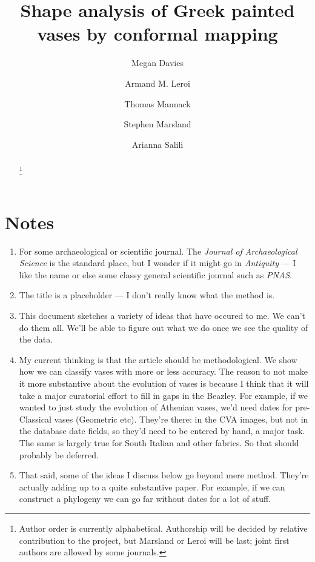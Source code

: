 \documentclass[onecolumn,10pt]{article}
\author[1]{Megan Davies}
\author[2]{Armand M. Leroi}
\author[3]{Thomas Mannack}
\author[2]{Stephen Marsland}
\author[4]{Arianna Salili}
\affil[1]{Department of Mathematics, Victoria University, Wellington, New Zealand}
\affil[2]{Department of Life Sciences, Imperial College London, London SW7 2AZ, UK}
\affil[3]{Department of Classics, University of Oxford}
\affil[4]{Department of Mathematics, Brunel University}
\title{Shape analysis of Greek painted vases by conformal mapping}
\begin{document}
\maketitle

\begin{abstract}
\footnote{Author order is currently alphabetical. Authorship will be decided by relative contribution to the project, but Marsland or Leroi will be last; joint first authors are allowed by some journals.}
\end{abstract}

\clearpage
\section*{Notes}

\begin{enumerate}
\item For some archaeological or scientific journal. The \emph{Journal of Archaeological Science} is the standard place, but I wonder if it might go in \emph{Antiquity} --- I like the name or else some classy general scientific journal such as \emph{PNAS}. 
\item The title is a placeholder --- I don't really know what the method is.
\item This document sketches a variety of ideas that have occured to me. We can't do them all.  We'll be able to figure out what we do once we see the quality of the data.
\item My current thinking is that the article should be methodological. We show how we can classify vases with more or less accuracy. The reason to not make it more substantive about the evolution of vases is because I think that it will take a major curatorial effort to fill in gaps in the Beazley.  For example, if we wanted to just study the evolution of Athenian vases, we'd need dates for pre-Classical vases (Geometric etc).  They're there: in the CVA images, but not in the database date fields, so they'd need to be entered by hand, a major task. The same is largely true for South Italian and other fabrics. So that should probably be deferred. 
\item That said, some of the ideas I discuss below go beyond mere method.  They're actually adding up to a quite substantive paper.  For example, if we can construct a phylogeny we can go far without dates for a lot of stuff. 

\end{enumerate}
\clearpage
\end{document}
